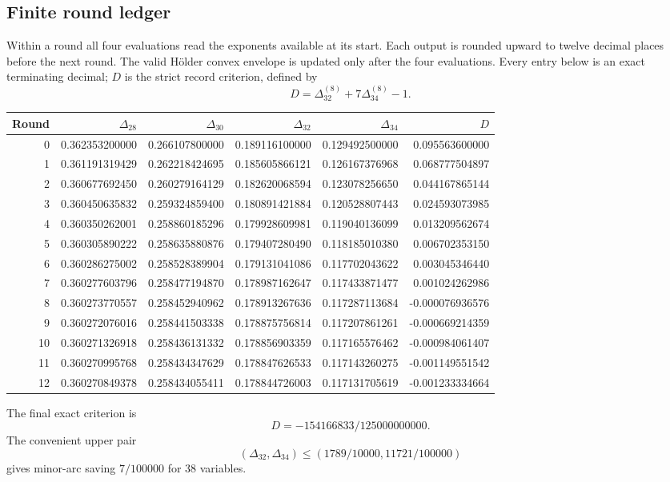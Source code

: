 \documentclass[11pt,letterpaper]{article}
\numberwithin{equation}{section}
\begin{document}
\subsection{Finite round ledger}
Within a round all four evaluations read the exponents available at its start.
Each output is rounded upward to twelve decimal places before the next round.
The valid H\"older convex envelope is updated only after the four evaluations.
Every entry below is an exact terminating decimal; $D$ is the strict
record criterion, defined by
\[D=\Delta_{32}^{(8)}+7\Delta_{34}^{(8)}-1.\]
\begin{center}
\small
\setlength{\tabcolsep}{4pt}
\begin{tabular}{rrrrrr}
\toprule
Round & $\Delta_{28}$ & $\Delta_{30}$ & $\Delta_{32}$ & $\Delta_{34}$ & $D$\\
\midrule
0 & 0.362353200000 & 0.266107800000 & 0.189116100000 & 0.129492500000 & 0.095563600000\\
1 & 0.361191319429 & 0.262218424695 & 0.185605866121 & 0.126167376968 & 0.068777504897\\
2 & 0.360677692450 & 0.260279164129 & 0.182620068594 & 0.123078256650 & 0.044167865144\\
3 & 0.360450635832 & 0.259324859400 & 0.180891421884 & 0.120528807443 & 0.024593073985\\
4 & 0.360350262001 & 0.258860185296 & 0.179928609981 & 0.119040136099 & 0.013209562674\\
5 & 0.360305890222 & 0.258635880876 & 0.179407280490 & 0.118185010380 & 0.006702353150\\
6 & 0.360286275002 & 0.258528389904 & 0.179131041086 & 0.117702043622 & 0.003045346440\\
7 & 0.360277603796 & 0.258477194870 & 0.178987162647 & 0.117433871477 & 0.001024262986\\
8 & 0.360273770557 & 0.258452940962 & 0.178913267636 & 0.117287113684 & -0.000076936576\\
9 & 0.360272076016 & 0.258441503338 & 0.178875756814 & 0.117207861261 & -0.000669214359\\
10 & 0.360271326918 & 0.258436131332 & 0.178856903359 & 0.117165576462 & -0.000984061407\\
11 & 0.360270995768 & 0.258434347629 & 0.178847626533 & 0.117143260275 & -0.001149551542\\
12 & 0.360270849378 & 0.258434055411 & 0.178844726003 & 0.117131705619 & -0.001233334664\\
\bottomrule
\end{tabular}
\end{center}
The final exact criterion is
\[D=-154166833/125000000000.\]
The convenient upper pair
\[(\Delta_{32},\Delta_{34})\le(1789/10000,11721/100000)\]
gives minor-arc saving $7/100000$ for 38 variables.
\end{document}

